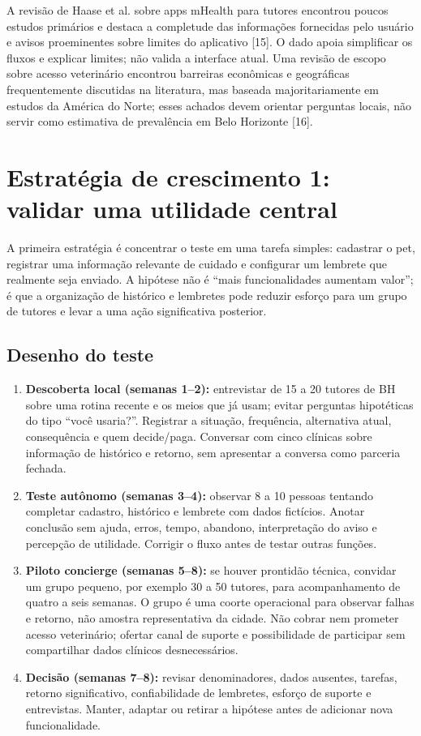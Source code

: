 \documentclass[12pt,a4paper]{article}
\begin{document}
A revisão de Haase et al. sobre apps mHealth para tutores encontrou poucos estudos primários e destaca a completude das informações fornecidas pelo usuário e avisos proeminentes sobre limites do aplicativo [15]. O dado apoia simplificar os fluxos e explicar limites; não valida a interface atual. Uma revisão de escopo sobre acesso veterinário encontrou barreiras econômicas e geográficas frequentemente discutidas na literatura, mas baseada majoritariamente em estudos da América do Norte; esses achados devem orientar perguntas locais, não servir como estimativa de prevalência em Belo Horizonte [16].

\section{Estratégia de crescimento 1: validar uma utilidade central}
A primeira estratégia é concentrar o teste em uma tarefa simples: cadastrar o pet, registrar uma informação relevante de cuidado e configurar um lembrete que realmente seja enviado. A hipótese não é “mais funcionalidades aumentam valor”; é que a organização de histórico e lembretes pode reduzir esforço para um grupo de tutores e levar a uma ação significativa posterior.

\subsection{Desenho do teste}
\begin{enumerate}[leftmargin=*]
\item \textbf{Descoberta local (semanas 1--2):} entrevistar de 15 a 20 tutores de BH sobre uma rotina recente e os meios que já usam; evitar perguntas hipotéticas do tipo “você usaria?”. Registrar a situação, frequência, alternativa atual, consequência e quem decide/paga. Conversar com cinco clínicas sobre informação de histórico e retorno, sem apresentar a conversa como parceria fechada.
\item \textbf{Teste autônomo (semanas 3--4):} observar 8 a 10 pessoas tentando completar cadastro, histórico e lembrete com dados fictícios. Anotar conclusão sem ajuda, erros, tempo, abandono, interpretação do aviso e percepção de utilidade. Corrigir o fluxo antes de testar outras funções.
\item \textbf{Piloto concierge (semanas 5--8):} se houver prontidão técnica, convidar um grupo pequeno, por exemplo 30 a 50 tutores, para acompanhamento de quatro a seis semanas. O grupo é uma coorte operacional para observar falhas e retorno, não amostra representativa da cidade. Não cobrar nem prometer acesso veterinário; ofertar canal de suporte e possibilidade de participar sem compartilhar dados clínicos desnecessários.
\item \textbf{Decisão (semanas 7--8):} revisar denominadores, dados ausentes, tarefas, retorno significativo, confiabilidade de lembretes, esforço de suporte e entrevistas. Manter, adaptar ou retirar a hipótese antes de adicionar nova funcionalidade.
\end{enumerate}
\end{document}
